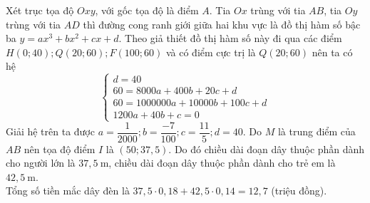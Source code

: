 \begin{bt}
{\begin{center}
		\end{center}
		Xét trục tọa độ $Oxy$, với gốc tọa độ là điểm $A$. Tia $Ox$ trùng với tia $A B$, tia $O y$ trùng với tia $A D$ thì đường cong ranh giới giữa hai  khu vực là đồ thị hàm số bậc ba $y=a x^3+b x^2+c x+d$.
		Theo giả thiết đồ thị  hàm số này đi qua các điểm $H(0; 40); Q(20; 60); F(100; 60)$ và có điểm cực trị là $Q(20; 60)$ nên ta có hệ
		 $$
		\left\{\begin{array}{l}
		d=40  \\
		60=8000 a+400 b+20 c+d  \\
		60=1000000 a+10000 b+100 c+d \\ 
		1200 a+40  b+c=0
	\end{array}\right.
	 $$
	Giải hệ  trên ta được $a=\dfrac{1}{2000}; b=\dfrac{-7}{100}; c=\dfrac{11}{5}; d=40$.
	Do $M$ là trung điểm của $A B$ nên tọa độ điểm $I$ là $(50; 37,5)$. Do đó chiều dài đoạn dây  thuộc phần dành cho người lớn là $37,5 \mathrm{~m}$, chiều dài đoạn dây thuộc phần dành cho trẻ em là $42,5 \mathrm{~m}$.\\
	Tổng  số tiền mắc dây đèn là $37,5 \cdot 0,18+42,5 \cdot 0,14=12,7$ (triệu đồng).
	 }
	\end{bt}

